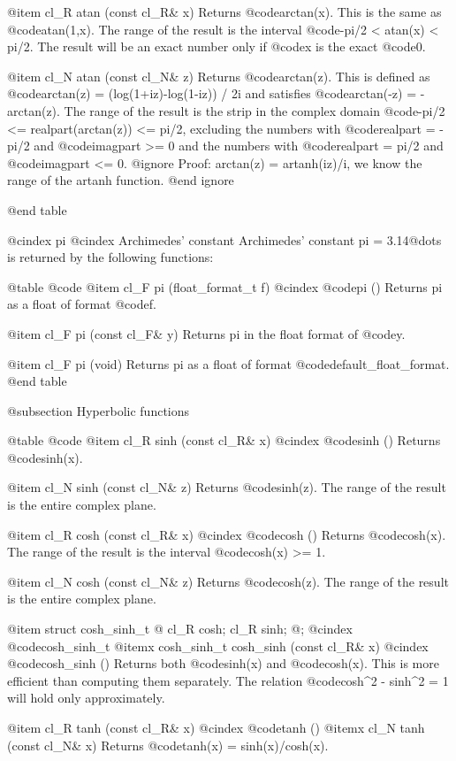 @item cl_R atan (const cl_R& x)
Returns @code{arctan(x)}. This is the same as @code{atan(1,x)}. The range
of the result is the interval @code{-pi/2 < atan(x) < pi/2}. The result
will be an exact number only if @code{x} is the exact @code{0}.

@item cl_N atan (const cl_N& z)
Returns @code{arctan(z)}. This is defined as
@code{arctan(z) = (log(1+iz)-log(1-iz)) / 2i} and satisfies
@code{arctan(-z) = -arctan(z)}. The range of the result is
the strip in the complex domain
@code{-pi/2 <= realpart(arctan(z)) <= pi/2}, excluding the numbers
with @code{realpart = -pi/2} and @code{imagpart >= 0} and the numbers
with @code{realpart = pi/2} and @code{imagpart <= 0}.
@ignore
Proof: arctan(z) = artanh(iz)/i, we know the range of the artanh function.
@end ignore

@end table

@cindex pi
@cindex Archimedes' constant
Archimedes' constant pi = 3.14@dots{} is returned by the following functions:

@table @code
@item cl_F pi (float_format_t f)
@cindex @code{pi ()}
Returns pi as a float of format @code{f}.

@item cl_F pi (const cl_F& y)
Returns pi in the float format of @code{y}.

@item cl_F pi (void)
Returns pi as a float of format @code{default_float_format}.
@end table


@subsection Hyperbolic functions

@table @code
@item cl_R sinh (const cl_R& x)
@cindex @code{sinh ()}
Returns @code{sinh(x)}.

@item cl_N sinh (const cl_N& z)
Returns @code{sinh(z)}. The range of the result is the entire complex plane.

@item cl_R cosh (const cl_R& x)
@cindex @code{cosh ()}
Returns @code{cosh(x)}. The range of the result is the interval
@code{cosh(x) >= 1}.

@item cl_N cosh (const cl_N& z)
Returns @code{cosh(z)}. The range of the result is the entire complex plane.

@item struct cosh_sinh_t @{ cl_R cosh; cl_R sinh; @};
@cindex @code{cosh_sinh_t}
@itemx cosh_sinh_t cosh_sinh (const cl_R& x)
@cindex @code{cosh_sinh ()}
Returns both @code{sinh(x)} and @code{cosh(x)}. This is more efficient than
computing them separately. The relation @code{cosh^2 - sinh^2 = 1} will
hold only approximately.

@item cl_R tanh (const cl_R& x)
@cindex @code{tanh ()}
@itemx cl_N tanh (const cl_N& x)
Returns @code{tanh(x) = sinh(x)/cosh(x)}.

